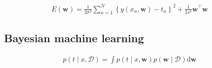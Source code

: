 \documentclass{article}
\begin{document}
\begin{align*}
E(\mathbf{w}) = \frac{1}{2 \sigma^{2}} \sum_{n=1}^{N} \left\{ y\left(x_{n}, \mathbf{w}\right) - t_{n} \right\}^{2} + \frac{1}{2 s^{2}} \mathbf{w}^{\top} \mathbf{w}
\tag{2.117}
\end{align*}

\subsection{Bayesian machine learning}

\begin{align*}
p(t \mid x, \mathcal{D}) = \int p(t \mid x, \mathbf{w}) p(\mathbf{w} \mid \mathcal{D}) \mathrm{d} \mathbf{w}
\tag{2.118}
\end{align*}
\end{document}
